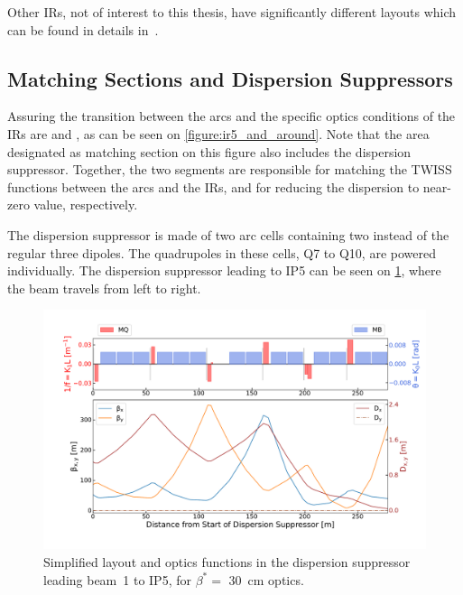 Other IRs, not of interest to this thesis, have significantly different layouts which can be found in details in~\cite{BOOK:Bruning:LHC_Design_Report_Main_Ring,PHD:Vanbavinckhove}.

\subsection{Matching Sections and Dispersion Suppressors}
\label{subsection:matching_sections_dispersion_suppressors}

Assuring the transition between the arcs and the specific optics conditions of the IRs are  and , as can be seen on \cref{figure:ir5_and_around}.
Note that the area designated as matching section on this figure also includes the dispersion suppressor.
Together, the two segments are responsible for matching the TWISS functions between the arcs and the IRs, and for reducing the dispersion to near-zero value, respectively.

The dispersion suppressor is made of two arc cells containing two instead of the regular three dipoles.
The quadrupoles in these cells, Q\num{7} to Q\num{10}, are powered individually.
The dispersion suppressor leading to IP\num{5} can be seen on \cref{figure:lhc_dispersion_suppressor}, where the beam travels from left to right.

\begin{figure}[!hbt]
  \centering
  \includegraphics*[width=0.99\linewidth]{Figures/Optics_Measurements_Corrections_at_LHC/lhc_dispersion_suppressor.pdf}
  \caption{Simplified layout and optics functions in the dispersion suppressor leading beam~\num{1} to IP\num{5}, for \(\beta^{\ast} =\) \qty{30}{\centi\meter} optics.}
  \label{figure:lhc_dispersion_suppressor}
\end{figure}

